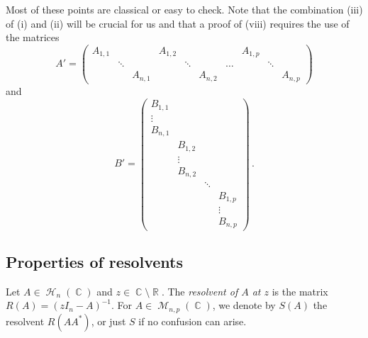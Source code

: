 \documentclass[11pt,a4paper]{article}
\DeclareMathOperator{\R}{\mathbb{R}}
\DeclareMathOperator{\C}{\mathbb{C}}
\DeclareMathOperator{\HH}{\mathcal{H}}
\DeclareMathOperator{\MM}{\mathcal{M}}
\DeclareMathOperator{\1}{\mathbf{1}}
\theoremstyle{definition}
\begin{document}
Most of these points are classical or easy to check. Note that the combination (iii) of (i) and (ii) will be crucial for us and that a proof of (viii) requires the use of the matrices
\begin{displaymath}
A' = \left( \begin{array}{ccccccccccc} A_{1,1} & & & A_{1,2} & & & & A_{1,p} & & \\ & \ddots & & & \ddots & & \ldots & & \ddots & \\ & & A_{n,1} & & & A_{n,2} & & & & A_{n,p} \end{array} \right)
\end{displaymath}
and
\begin{displaymath}
B' = \left( \begin{array}{cccc} B_{1,1} \\ \vdots \\ B_{n,1} \\ & B_{1,2} \\ & \vdots \\ & B_{n,2} \\ & & \ddots \\ & & & B_{1,p} \\ & & & \vdots \\ & & & B_{n,p} \end{array} \right) \, .
\end{displaymath}




\subsection{Properties of resolvents} \label{resolvents}

Let $A \in \HH_n(\C)$ and $z \in \C \setminus \R$. The \emph{resolvent of $A$ at $z$} is the matrix $R(A) = (zI_n-A)^{-1}$. For $A \in \MM_{n,p}(\C)$, we denote by $S(A)$ the resolvent $R(AA^*)$, or just $S$ if no confusion can arise.
\end{document}

